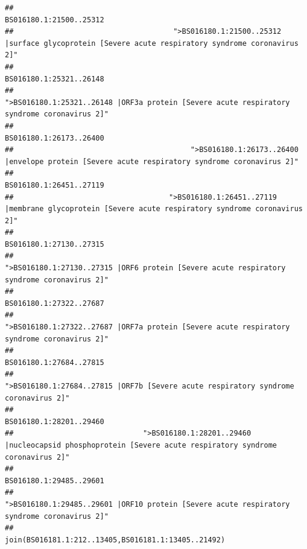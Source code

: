 \documentclass[
]{article}
\begin{document}
\begin{verbatim}
##                                                                                                                BS016180.1:21500..25312 
##                                     ">BS016180.1:21500..25312 |surface glycoprotein [Severe acute respiratory syndrome coronavirus 2]" 
##                                                                                                                BS016180.1:25321..26148 
##                                            ">BS016180.1:25321..26148 |ORF3a protein [Severe acute respiratory syndrome coronavirus 2]" 
##                                                                                                                BS016180.1:26173..26400 
##                                         ">BS016180.1:26173..26400 |envelope protein [Severe acute respiratory syndrome coronavirus 2]" 
##                                                                                                                BS016180.1:26451..27119 
##                                    ">BS016180.1:26451..27119 |membrane glycoprotein [Severe acute respiratory syndrome coronavirus 2]" 
##                                                                                                                BS016180.1:27130..27315 
##                                             ">BS016180.1:27130..27315 |ORF6 protein [Severe acute respiratory syndrome coronavirus 2]" 
##                                                                                                                BS016180.1:27322..27687 
##                                            ">BS016180.1:27322..27687 |ORF7a protein [Severe acute respiratory syndrome coronavirus 2]" 
##                                                                                                                BS016180.1:27684..27815 
##                                                    ">BS016180.1:27684..27815 |ORF7b [Severe acute respiratory syndrome coronavirus 2]" 
##                                                                                                                BS016180.1:28201..29460 
##                              ">BS016180.1:28201..29460 |nucleocapsid phosphoprotein [Severe acute respiratory syndrome coronavirus 2]" 
##                                                                                                                BS016180.1:29485..29601 
##                                            ">BS016180.1:29485..29601 |ORF10 protein [Severe acute respiratory syndrome coronavirus 2]" 
##                                                                                    join(BS016181.1:212..13405,BS016181.1:13405..21492) 

\end{verbatim}
\end{document}
